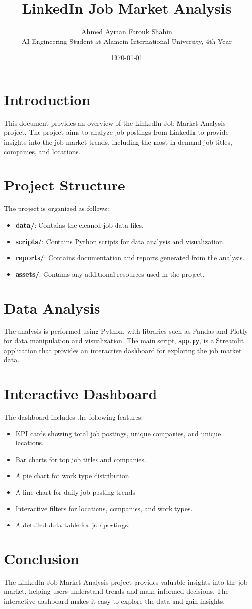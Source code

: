 \documentclass{article}
\title{LinkedIn Job Market Analysis}
\author{Ahmed Ayman Farouk Shahin \\ AI Engineering Student at Alamein International University, 4th Year}
\date{\today}
\begin{document}
\maketitle

\section{Introduction}
This document provides an overview of the LinkedIn Job Market Analysis project. The project aims to analyze job postings from LinkedIn to provide insights into the job market trends, including the most in-demand job titles, companies, and locations.

\section{Project Structure}
The project is organized as follows:
\begin{itemize}
    \item \textbf{data/}: Contains the cleaned job data files.
    \item \textbf{scripts/}: Contains Python scripts for data analysis and visualization.
    \item \textbf{reports/}: Contains documentation and reports generated from the analysis.
    \item \textbf{assets/}: Contains any additional resources used in the project.
\end{itemize}

\section{Data Analysis}
The analysis is performed using Python, with libraries such as Pandas and Plotly for data manipulation and visualization. The main script, \texttt{app.py}, is a Streamlit application that provides an interactive dashboard for exploring the job market data.

\section{Interactive Dashboard}
The dashboard includes the following features:
\begin{itemize}
    \item KPI cards showing total job postings, unique companies, and unique locations.
    \item Bar charts for top job titles and companies.
    \item A pie chart for work type distribution.
    \item A line chart for daily job posting trends.
    \item Interactive filters for locations, companies, and work types.
    \item A detailed data table for job postings.
\end{itemize}

\section{Conclusion}
The LinkedIn Job Market Analysis project provides valuable insights into the job market, helping users understand trends and make informed decisions. The interactive dashboard makes it easy to explore the data and gain insights.
\end{document}
